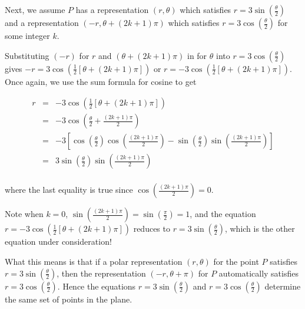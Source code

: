 \documentclass{ximera}
\begin{document}
\begin{example}
\begin{explanation}
\begin{enumerate}
Next, we assume $P$ has a representation $(r,\theta)$ which satisfies $r=3\sin\left(\frac{\theta}{2}\right)$ and  a representation $(-r, \theta + (2k+1)\pi)$ which satisfies $r = 3\cos\left(\frac{\theta}{2}\right)$ for some integer $k$.  



Substituting $(-r)$ for $r$ and $(\theta + (2k+1)\pi)$ in for $\theta$ into $r = 3\cos\left(\frac{\theta}{2}\right)$ gives  $-r = 3\cos\left(\frac{1}{2}\left[ \theta + (2k+1)\pi\right]\right)$ or $r = -3\cos\left(\frac{1}{2}\left[ \theta + (2k+1)\pi\right]\right)$.  Once again, we use the sum formula for cosine to get

\[ \begin{array}{rcl}

r &  = & -3 \cos\left(\frac{1}{2}\left[ \theta + (2k+1)\pi\right]\right)  \\
  &  = & -3  \cos\left(\frac{\theta}{2} + \frac{(2k+1)\pi}{2} \right) \\
  & =  & -3 \left[\cos\left(\frac{\theta}{2}\right) \cos\left(\frac{(2k+1)\pi}{2}\right) - \sin\left(\frac{\theta}{2}\right) \sin\left(\frac{(2k+1)\pi}{2}\right) \right] \\
  & = &  3 \sin\left(\frac{\theta}{2}\right)  \sin\left(\frac{(2k+1)\pi}{2}\right) \\ \end{array}\]
                                                         
where the last equality is true  since $\cos\left(\frac{(2k+1)\pi}{2}\right) = 0$.  



Note when $k = 0$,  $\sin\left(\frac{(2k+1)\pi}{2}\right) = \sin\left(\frac{\pi}{2}\right)= 1$, and the equation  $r = -3\cos\left(\frac{1}{2}\left[ \theta + (2k+1)\pi\right]\right)$  reduces to $r = 3\sin\left(\frac{\theta}{2}\right)$,  which is the other equation under consideration!



What this means is that if a polar representation $(r,\theta)$ for the point $P$ satisfies $r = 3\sin\left(\frac{\theta}{2}\right)$, then the representation  $(-r, \theta + \pi)$ for $P$ automatically satisfies $r = 3\cos\left(\frac{\theta}{2}\right)$.  
Hence the equations $r = 3\sin\left(\frac{\theta}{2}\right)$ and $r = 3\cos\left(\frac{\theta}{2}\right)$ determine the same set of points in the plane.  

\end{enumerate}
\end{explanation}
\end{example}
\end{document}
